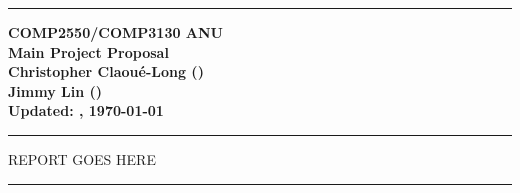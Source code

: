\documentclass[12pt,a4paper]{article}
\newcommand{\Hrule}{\textcolor{blue}{\rule{\linewidth}{0.5mm}}} %
\begin{document}
\begin{center}
\Hrule\vspace{1em}
\textbf{\Huge COMP2550/COMP3130 ANU\\Main Project Proposal}\\
\textbf{\large Christopher Claou\'e-Long 
(\href{mailto:u5183532@anu.edu.au}{\textit{\underline{}}})\\
Jimmy Lin 
(\href{mailto:u5223173@anu.edu.au}{\textit{\underline{}}})\\}
\textbf{Updated: \currenttime, \today}			%
\Hrule
\end{center}
\begin{multicols}{2}
REPORT GOES HERE
\end{multicols}

\vfill\Hrule
\end{document}
